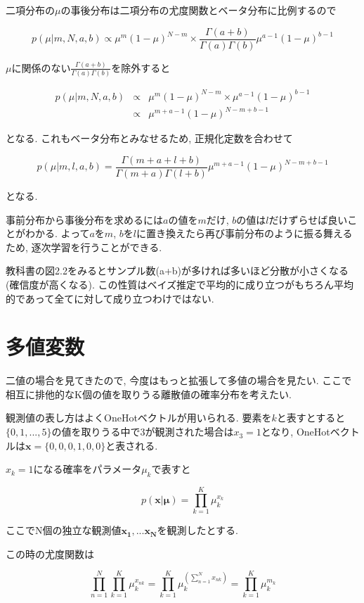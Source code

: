 二項分布の$\mu$の事後分布は二項分布の尤度関数とベータ分布に比例するので

$$ p(\mu | m, N, a, b) \propto \mu^m(1-\mu)^{N-m} \times \frac{\Gamma (a+b)}{\Gamma (a) \Gamma (b)}\mu^{a-1}(1-\mu)^{b-1} $$

$\mu$に関係のない$\frac{\Gamma (a+b)}{\Gamma (a) \Gamma (b)}$を除外すると

\begin{eqnarray*}
    p(\mu | m, N, a, b) &\propto& \mu^m(1-\mu)^{N-m} \times \mu^{a-1}(1-\mu)^{b-1} \\
                        &\propto& \mu^{m+a-1}(1-\mu)^{N-m+b-1}
\end{eqnarray*}

となる. これもベータ分布とみなせるため, 正規化定数を合わせて

$$ p(\mu | m, l, a, b) = \frac{\Gamma (m+a+l+b)}{\Gamma (m+a) \Gamma (l+b)} \mu^{m+a-1}(1-\mu)^{N-m+b-1}$$

となる.

事前分布から事後分布を求めるには$a$の値を$m$だけ, $b$の値は$l$だけずらせば良いことがわかる.
よって$a$を$m$, $b$を$l$に置き換えたら再び事前分布のように振る舞えるため, 逐次学習を行うことができる.

教科書の図2.2をみるとサンプル数(a+b)が多ければ多いほど分散が小さくなる(確信度が高くなる).
この性質はベイズ推定で平均的に成り立つがもちろん平均的であって全てに対して成り立つわけではない.

\section{多値変数}

二値の場合を見てきたので, 今度はもっと拡張して多値の場合を見たい.
ここで相互に排他的なK個の値を取りうる離散値の確率分布を考えたい.

観測値の表し方はよくOneHotベクトルが用いられる.
要素を$k$と表すとすると$\{0, 1, ..., 5\}$の値を取りうる中で3が観測された場合は$x_3=1$となり, OneHotベクトルは$\bm{x} = \{ 0, 0, 0, 1, 0, 0 \}$と表される.

$x_k = 1$になる確率をパラメータ$\mu_k$で表すと

$$ p(\bm{x}|\bm{\mu}) = \prod_{k=1}^K \mu_k^{x_k} $$

ここでN個の独立な観測値$\bm{x_1}, ... \bm{x_N}$を観測したとする.

この時の尤度関数は

$$ \prod_{n=1}^N\prod_{k=1}^K\mu_k^{x_{nk}} = \prod_{k=1}^K\mu_k^{(\sum_{n=1}^Nx_{nk})} = \prod_{k=1}^K\mu_k^{m_k} $$

